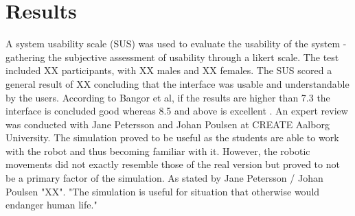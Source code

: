 \section{Results}
A system usability scale (SUS) was used to evaluate the usability of the system - gathering the subjective assessment of usability through a likert scale. The test included XX participants, with XX males and XX females. The SUS scored a general result of XX concluding that the interface was usable and understandable by the users. According to Bangor et al, if the results are higher than 7.3 the interface is concluded good whereas 8.5 and above is excellent \citep{bangor_empirical_2008}.
An expert review was conducted with Jane Petersson and Johan Poulsen at CREATE Aalborg University. The simulation proved to be useful as the students are able to work with the robot and thus becoming familiar with it. However, the robotic movements did not exactly resemble those of the real version but proved to not be a primary factor of the simulation. As stated by Jane Petersson / Johan Poulsen "XX". "The simulation is useful for situation that otherwise would endanger human life."